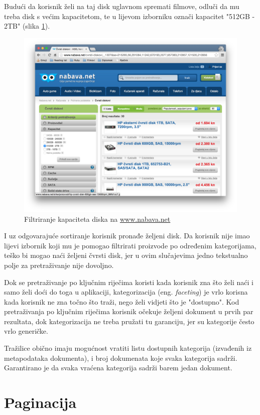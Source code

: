 \documentclass[a4paper,twoside,12pt]{memoir}
\begin{document}
Budući da korisnik želi na taj disk uglavnom spremati filmove, odluči da mu treba disk s većim kapacitetom, te u lijevom izborniku označi kapacitet "512GB - 2TB" (slika \ref{nabava3}).

\begin{figure}[H]
  \centering
  \includegraphics[width=\textwidth]{nabava3}
  \caption{Filtriranje kapaciteta diska na \url{www.nabava.net}}
  \label{nabava3}
\end{figure}

I uz odgovarajuće sortiranje korisnik pronađe željeni disk. Da korisnik nije imao lijevi izbornik koji mu je pomogao filtrirati proizvode po određenim kategorijama, teško bi mogao naći željeni čvrsti disk, jer u ovim slučajevima jedno tekstualno polje za pretraživanje nije dovoljno.

Dok se pretraživanje po ključnim riječima koristi kada korisnik zna što želi naći i samo želi doći do toga u aplikaciji, kategorizacija (eng. \textit{faceting}) je vrlo korisna kada korisnik ne zna točno što traži, nego želi vidjeti što je "dostupno". Kod pretraživanja po ključnim riječima korisnik očekuje željeni dokument u prvih par rezultata, dok kategorizacija ne treba pružati tu garanciju, jer su kategorije često vrlo generičke.

Tražilice obično imaju mogućnost vratiti listu dostupnih kategorija (izvađenih iz metapodataka dokumenta), i broj dokumenata koje svaka kategorija sadrži. Garantirano je da svaka vraćena kategorija sadrži barem jedan dokument.

\section{Paginacija}
\end{document}
